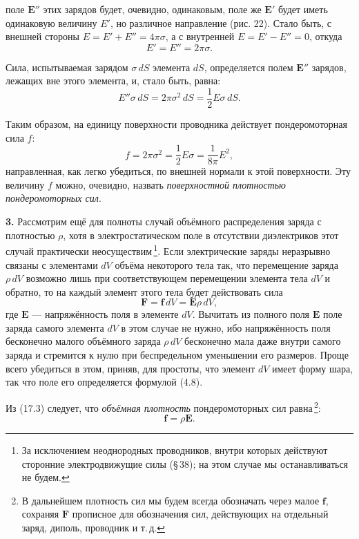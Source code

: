 \documentclass[a4paper,12pt]{article}
\begin{document}

поле $\mathbf{E}''$ этих зарядов будет, очевидно, одинаковым, поле же
$\mathbf{E}'$ будет иметь одинаковую величину $E'$, но различное
направление (рис. 22). Стало быть, с внешней стороны $E = E' + E'' =
4\pi\sigma$, а с внутренней $E = E' - E'' = 0$, откуда
$$
    E' = E'' = 2\pi\sigma.
$$

Сила, испытываемая зарядом $\sigma\,dS$ элемента $dS$, определяется
полем $\mathbf{E}''$ зарядов, лежащих вне этого элемента, и, стало
быть, равна:
$$
    E''\sigma\,dS = 2\pi\sigma^2\,dS = \frac{1}{2}E\sigma\,dS.
$$

Таким образом, на единицу поверхности проводника действует
пондеромоторная сила $f$:
\begin{equation}
    f = 2\pi\sigma^2 = \frac{1}{2}E\sigma = \frac{1}{8\pi}E^2,
    \tag{17.2}
\end{equation}
направленная, как легко убедиться, по внешней нормали к этой
поверхности. Эту величину $f$ можно, очевидно, назвать
\textit{поверхностной плотностью пондеромоторных сил}.

\textbf{3.} Рассмотрим ещё для полноты случай объёмного распределения
заряда с плотностью $\rho$, хотя в электростатическом поле в отсутствии
диэлектриков этот случай практически неосуществим\,\footnote{За
исключением неоднородных проводников, внутри которых действуют сторонние
электродвижущие силы (§\,38); на этом случае мы останавливаться не
будем.}. Если электрические заряды неразрывно связаны с элементами $dV$
объёма некоторого тела так, что перемещение заряда $\rho\,dV$ возможно
лишь при соответствующем перемещении элемента тела $dV$ и обратно, то
на каждый элемент этого тела будет действовать сила
\begin{equation}
    \mathbf{F} = \mathbf{f}\,dV = \mathbf{E}\rho\,dV,
    \tag{17.3}
\end{equation}
где $\mathbf{E}$ — напряжённость поля в элементе $dV$. Вычитать из
полного поля $\mathbf{E}$ поле заряда самого элемента $dV$ в этом случае
не нужно, ибо напряжённость поля бесконечно малого объёмного заряда
$\rho\,dV$ бесконечно мала даже внутри самого заряда и стремится к нулю
при беспредельном уменьшении его размеров. Проще всего убедиться в этом,
приняв, для простоты, что элемент $dV$ имеет форму шара, так что поле
его определяется формулой (4.8).

Из (17.3) следует, что \textit{объёмная плотность} пондеромоторных
сил равна\,\footnote{В дальнейшем плотность сил мы будем всегда
обозначать через малое $\mathbf{f}$, сохраняя $\mathbf{F}$ прописное
для обозначения сил, действующих на отдельный заряд, диполь, проводник
и т.\,д.}:
\begin{equation}
    \mathbf{f} = \rho\mathbf{E}.
    \tag{17.4}
\end{equation}
\end{document}
